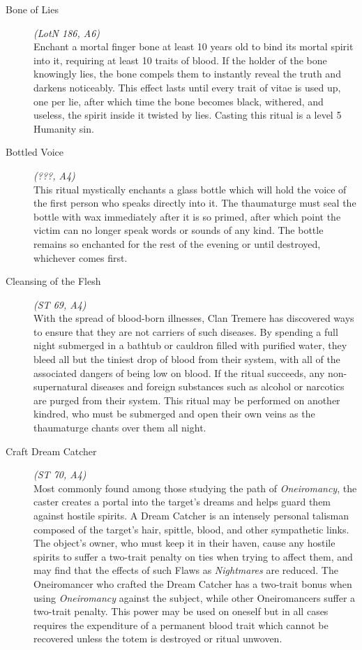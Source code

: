 \begin{description}
	\item[Bone of Lies] \emph{(LotN 186, A6)} \hfill \\
	Enchant a mortal finger bone at least 10 years old to bind its mortal spirit into it, requiring at least 10 traits of blood.  
	If the holder of the bone knowingly lies, the bone compels them to instantly reveal the truth and darkens noticeably.  
	This effect lasts until every trait of vitae is used up, one per lie, after which time the bone becomes black, withered, and 
	useless, the spirit inside it twisted by lies. Casting this ritual is a level 5 Humanity sin. \\

	\item[Bottled Voice] \emph{(???, A4)} \hfill \\
	This ritual mystically enchants a glass bottle which will hold the voice of the first person who speaks directly into it.  
	The thaumaturge must seal the bottle with wax immediately after it is so primed, after which point the victim can no longer 
	speak words or sounds of any kind.  The bottle remains so enchanted for the rest of the evening or until destroyed, 
	whichever comes first. \\

	\item[Cleansing of the Flesh] \emph{(ST 69, A4)} \hfill \\
	With the spread of blood-born illnesses, Clan Tremere has discovered ways to ensure that they are not carriers of such 
	diseases.  By spending a full night submerged in a bathtub or cauldron filled with purified water, they bleed all but the 
	tiniest drop of blood from their system, with all of the associated dangers of being low on blood.  If the ritual 
	succeeds, any non-supernatural diseases and foreign substances such as alcohol or narcotics are purged from their system.  
	This ritual may be performed on another kindred, who must be submerged and open their own veins as the thaumaturge chants  
	over them all night. \\

	\item[Craft Dream Catcher] \emph{(ST 70, A4)} \hfill \\
	Most commonly found among those studying the path of \emph{Oneiromancy}, the caster creates a portal into the target's 
	dreams and helps guard them against hostile spirits.  A Dream Catcher is an intensely personal talisman composed of the 
	target's hair, spittle, blood, and other sympathetic links.  The object's owner, who must keep it in their haven, cause 
	any hostile spirits to suffer a two-trait penalty on ties when trying to affect them, and may find that the effects of 
	such Flaws as \emph{Nightmares} are reduced.  The Oneiromancer who crafted the Dream Catcher has a two-trait bonus when 
	using \emph{Oneiromancy} against the subject, while other Oneiromancers suffer a two-trait penalty.  This power may be 
	used on oneself but in all cases requires the expenditure of a permanent blood trait which cannot be recovered unless
	the totem is destroyed or ritual unwoven. \\


\end{description}
